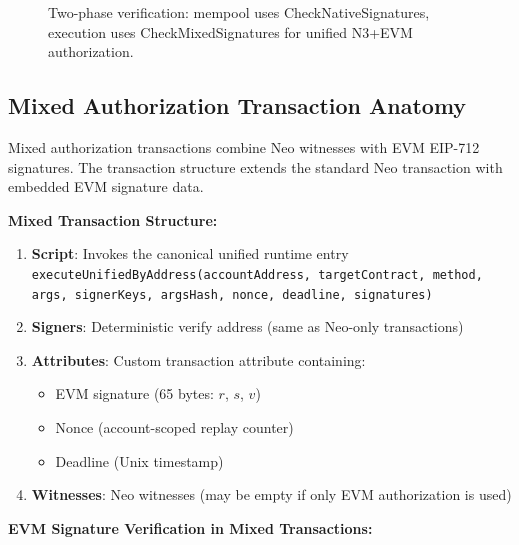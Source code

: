 \documentclass[10pt,twocolumn]{article}
\newcommand{\code}[1]{\texttt{\small #1}}
\begin{document}
{\begin{figure}[htbp]
\caption{Two-phase verification: mempool uses CheckNativeSignatures, execution uses CheckMixedSignatures for unified N3+EVM authorization.}
\label{fig:two_phase_verification}
\end{figure}


\subsection{Mixed Authorization Transaction Anatomy}

Mixed authorization transactions combine Neo witnesses with EVM EIP-712 signatures. The transaction structure extends the standard Neo transaction with embedded EVM signature data.

\textbf{Mixed Transaction Structure:}

\begin{enumerate}[leftmargin=*,topsep=2pt,itemsep=1pt]
\item \textbf{Script}: Invokes the canonical unified runtime entry \code{executeUnifiedByAddress(accountAddress, targetContract, method, args, signerKeys, argsHash, nonce, deadline, signatures)}
\item \textbf{Signers}: Deterministic verify address (same as Neo-only transactions)
\item \textbf{Attributes}: Custom transaction attribute containing:
  \begin{itemize}[leftmargin=*,topsep=2pt,itemsep=1pt]
  \item EVM signature (65 bytes: $r$, $s$, $v$)
  \item Nonce (account-scoped replay counter)
  \item Deadline (Unix timestamp)
  \end{itemize}
\item \textbf{Witnesses}: Neo witnesses (may be empty if only EVM authorization is used)
\end{enumerate}

\textbf{EVM Signature Verification in Mixed Transactions:}

}
\end{document}
